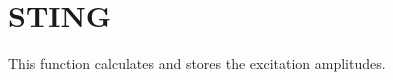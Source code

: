 \section{STING}
\label{sect:sting}

\noindent This function calculates and stores the excitation amplitudes.\\
